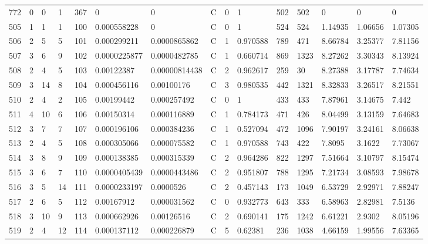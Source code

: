 \begin{latin}
\begin{longtable}{lllllllllllllll}
	772 & 0  & 0   & 1  & 367 & 0              & 0              & C & 0  & 1        & 502  & 502  & 0       & 0       & 0       \\
	505 & 1  & 1   & 1  & 100 & 0.000558228    & 0              & C & 0  & 1        & 524  & 524  & 1.14935 & 1.06656 & 1.07305 \\
	506 & 2  & 5   & 5  & 101 & 0.000299211    & 0.0000865862   & C & 1  & 0.970588 & 789  & 471  & 8.66784 & 3.25377 & 7.81156 \\
	507 & 3  & 6   & 9  & 102 & 0.0000225877   & 0.0000482785   & C & 1  & 0.660714 & 869  & 1323 & 8.27262 & 3.30343 & 8.13924 \\
	508 & 2  & 4   & 5  & 103 & 0.00122387     & 0.00000814438  & C & 2  & 0.962617 & 259  & 30   & 8.27388 & 3.17787 & 7.74634 \\
	509 & 3  & 14  & 8  & 104 & 0.000456116    & 0.00100176     & C & 3  & 0.980535 & 442  & 1321 & 8.32833 & 3.26517 & 8.21551 \\
	510 & 2  & 4   & 2  & 105 & 0.00199442     & 0.000257492    & C & 0  & 1        & 433  & 433  & 7.87961 & 3.14675 & 7.442   \\
	511 & 4  & 10  & 6  & 106 & 0.00150314     & 0.000116889    & C & 1  & 0.784173 & 471  & 426  & 8.04499 & 3.13159 & 7.64683 \\
	512 & 3  & 7   & 7  & 107 & 0.000196106    & 0.000384236    & C & 1  & 0.527094 & 472  & 1096 & 7.90197 & 3.24161 & 8.06638 \\
	513 & 2  & 4   & 5  & 108 & 0.000305066    & 0.000075582    & C & 1  & 0.970588 & 743  & 422  & 7.8095  & 3.1622  & 7.73067 \\
	514 & 3  & 8   & 9  & 109 & 0.000138385    & 0.000315339    & C & 2  & 0.964286 & 822  & 1297 & 7.51664 & 3.10797 & 8.15474 \\
	515 & 3  & 6   & 7  & 110 & 0.0000405439   & 0.0000443486   & C & 2  & 0.951807 & 788  & 1295 & 7.21734 & 3.08593 & 7.98678 \\
	516 & 3  & 5   & 14 & 111 & 0.0000233197   & 0.0000526      & C & 2  & 0.457143 & 173  & 1049 & 6.53729 & 2.92971 & 7.88247 \\
	517 & 2  & 6   & 5  & 112 & 0.00167912     & 0.000031562    & C & 0  & 0.932773 & 643  & 333  & 6.58963 & 2.82981 & 7.5136  \\
	518 & 3  & 10  & 9  & 113 & 0.000662926    & 0.00126516     & C & 2  & 0.690141 & 175  & 1242 & 6.61221 & 2.9302  & 8.05196 \\
	519 & 2  & 4   & 12 & 114 & 0.000137112    & 0.000226879    & C & 5  & 0.62381  & 236  & 1038 & 4.66159 & 1.99556 & 7.63365 \\

\end{longtable}
\end{latin}
